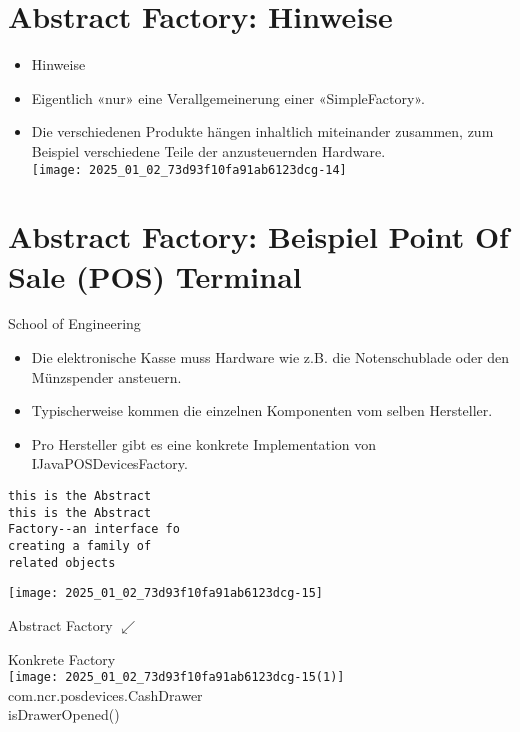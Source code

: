 \section*{Abstract Factory: Hinweise}
\begin{itemize}
  \item Hinweise
  \item Eigentlich «nur» eine Verallgemeinerung einer «SimpleFactory».
  \item Die verschiedenen Produkte hängen inhaltlich miteinander zusammen, zum Beispiel verschiedene Teile der anzusteuernden Hardware.\\
\texttt{[image: 2025\_01\_02\_73d93f10fa91ab6123dcg-14]}
\end{itemize}

\section*{Abstract Factory: Beispiel Point Of Sale (POS) Terminal}
School of Engineering

\begin{itemize}
  \item Die elektronische Kasse muss Hardware wie z.B. die Notenschublade oder den Münzspender ansteuern.
  \item Typischerweise kommen die einzelnen Komponenten vom selben Hersteller.
  \item Pro Hersteller gibt es eine konkrete Implementation von IJavaPOSDevicesFactory.
\end{itemize}

\begin{verbatim}
this is the Abstract
this is the Abstract 
Factory--an interface fo
creating a family of
related objects
\end{verbatim}

\begin{center}
\texttt{[image: 2025\_01\_02\_73d93f10fa91ab6123dcg-15]}
\end{center}

Abstract Factory $\swarrow$

Konkrete Factory\\
\texttt{[image: 2025\_01\_02\_73d93f10fa91ab6123dcg-15(1)]}\\
com.ncr.posdevices.CashDrawer\\
isDrawerOpened()

